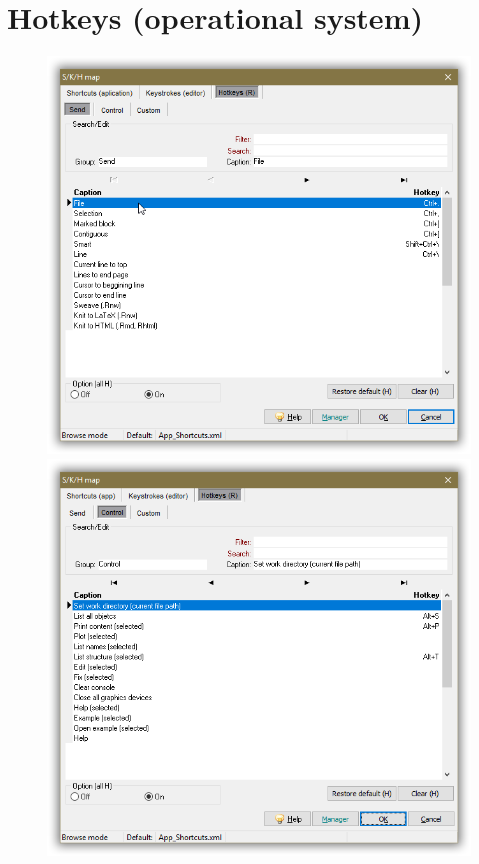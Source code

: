 
\hypertarget{working_hotkeys}{}
\section{Hotkeys (operational system)}

\begin{figure}[H]
  \includegraphics[scale=0.36]{./res/skh_map_rh_send_dlg.png}
  \includegraphics[scale=0.36]{./res/skh_map_rh_control_dlg.png}

\end{figure}
